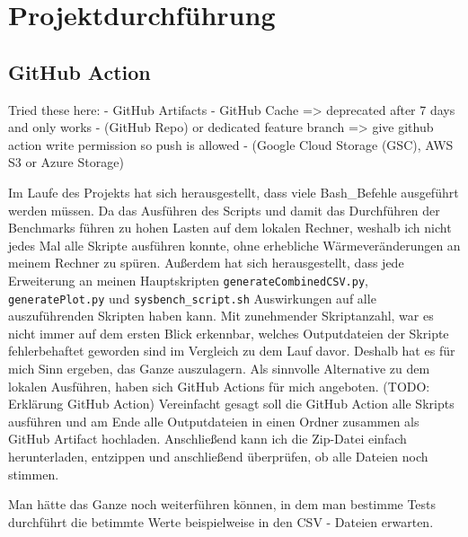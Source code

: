 \chapter{Projektdurchführung}\label{ch:projektdurchfuhrung}

\section{GitHub Action}\label{sec:github-action}

Tried these here:
- GitHub Artifacts
- GitHub Cache => deprecated after 7 days and only works
- (GitHub Repo) or dedicated feature branch => give github action write permission so push is allowed
- (Google Cloud Storage (GSC), AWS S3 or Azure Storage)


Im Laufe des Projekts hat sich herausgestellt, dass viele Bash\_Befehle ausgeführt werden müssen.
Da das Ausführen des Scripts und damit das Durchführen der Benchmarks führen zu hohen Lasten auf dem lokalen Rechner, weshalb ich nicht jedes Mal alle Skripte ausführen konnte, ohne erhebliche Wärmeveränderungen an meinem Rechner zu spüren.
Außerdem hat sich herausgestellt, dass jede Erweiterung an meinen Hauptskripten \texttt{generateCombinedCSV.py}, \texttt{generatePlot.py} und \texttt{sysbench\_script.sh} Auswirkungen auf alle auszuführenden Skripten haben kann.
Mit zunehmender Skriptanzahl, war es nicht immer auf dem ersten Blick erkennbar, welches Outputdateien der Skripte fehlerbehaftet geworden sind im Vergleich zu dem Lauf davor.
Deshalb hat es für mich Sinn ergeben, das Ganze auszulagern.
Als sinnvolle Alternative zu dem lokalen Ausführen, haben sich GitHub Actions für mich angeboten.
(TODO: Erklärung GitHub Action)
Vereinfacht gesagt soll die GitHub Action alle Skripts ausführen und am Ende alle Outputdateien in einen Ordner zusammen als GitHub Artifact hochladen.
Anschließend kann ich die Zip-Datei einfach herunterladen, entzippen und anschließend überprüfen, ob alle Dateien noch stimmen.

Man hätte das Ganze noch weiterführen können, in dem man bestimme Tests durchführt die betimmte Werte beispielweise in den CSV - Dateien erwarten.

